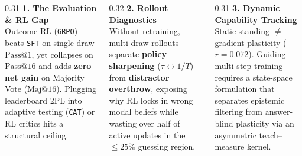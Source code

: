 \documentclass[aspectratio=169, 10pt]{beamer}
\begin{document}
\begin{frame}[plain]
  \begin{columns}[T, onlytextwidth]
    \begin{column}{0.31\textwidth}
      \textbf{\color{RedGRPO}1. The Evaluation \& RL Gap}\\[1mm]
      Outcome RL (\texttt{GRPO}) beats \texttt{SFT} on single-draw $\mathrm{Pass@1}$, yet collapses on $\mathrm{Pass@16}$ and adds \textbf{zero net gain} on Majority Vote ($\mathrm{Maj@16}$). Plugging leaderboard 2PL into adaptive testing (\texttt{CAT}) or RL critics hits a structural ceiling.\par
    \end{column}
    \begin{column}{0.32\textwidth}
      \textbf{\color{BlueSFT}2. Rollout Diagnostics}\\[1mm]
      Without retraining, multi-draw rollouts separate \textbf{policy sharpening} ($\tau \leftrightarrow 1/T$) from \textbf{distractor overthrow}, exposing why RL locks in wrong modal beliefs while wasting over half of active updates in the $\le 25\%$ guessing region.\par
    \end{column}
    \begin{column}{0.31\textwidth}
      \textbf{\color{PurpleIRT}3. Dynamic Capability Tracking}\\[1mm]
      Static standing $\neq$ gradient plasticity ($r=0.072$). Guiding multi-step training requires a state-space formulation that separates epistemic filtering from answer-blind plasticity via an asymmetric teach–measure kernel.\par
    \end{column}
  \end{columns}
\end{frame}
\end{document}

